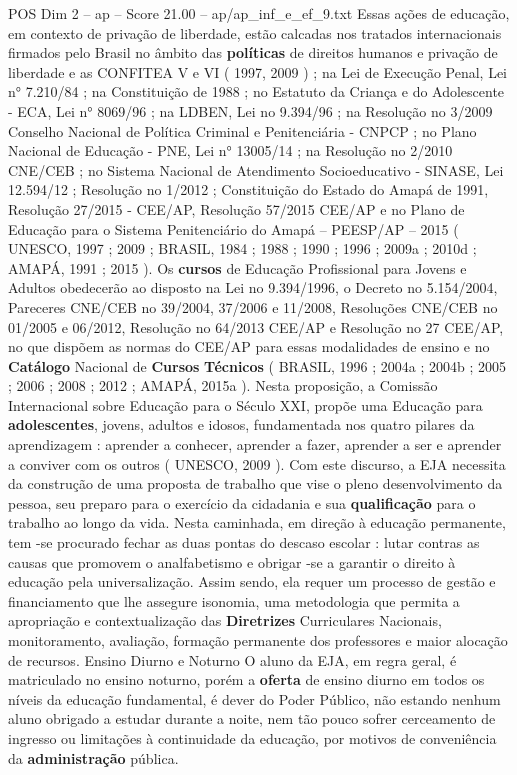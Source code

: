 \begin{textsample}{POS Dim 2 – ap – Score 21.00 – ap/ap\_inf\_e\_ef\_9.txt}
Essas ações de educação, em contexto de privação de liberdade, estão calcadas nos tratados internacionais firmados pelo Brasil no âmbito das \textbf{políticas} de direitos humanos e privação de liberdade e as CONFITEA V e VI ( 1997, 2009 ) ; na Lei de Execução Penal, Lei n{\EmojiFont °} 7.210/84 ; na Constituição de 1988 ; no Estatuto da Criança e do Adolescente - ECA, Lei n{\EmojiFont °} 8069/96 ; na LDBEN, Lei no 9.394/96 ; na Resolução no 3/2009 Conselho Nacional de Política Criminal e Penitenciária - CNPCP ; no Plano Nacional de Educação - PNE, Lei n{\EmojiFont °} 13005/14 ; na Resolução no 2/2010 CNE/CEB ; no Sistema Nacional de Atendimento Socioeducativo - SINASE, Lei 12.594/12 ; Resolução no 1/2012 ; Constituição do Estado do Amapá de 1991, Resolução 27/2015 - CEE/AP, Resolução 57/2015 CEE/AP e no Plano de Educação para o Sistema Penitenciário do Amapá – PEESP/AP – 2015 ( UNESCO, 1997 ; 2009 ; BRASIL, 1984 ; 1988 ; 1990 ; 1996 ; 2009a ; 2010d ; AMAPÁ, 1991 ; 2015 ).
Os \textbf{cursos} de Educação Profissional para Jovens e Adultos obedecerão ao disposto na Lei no 9.394/1996, o Decreto no 5.154/2004, Pareceres CNE/CEB no 39/2004, 37/2006 e 11/2008, Resoluções CNE/CEB no 01/2005 e 06/2012, Resolução no 64/2013 CEE/AP e Resolução no 27 CEE/AP, no que dispõem as normas do CEE/AP para essas modalidades de ensino e no \textbf{Catálogo} Nacional de \textbf{Cursos} \textbf{Técnicos} ( BRASIL, 1996 ; 2004a ; 2004b ; 2005 ; 2006 ; 2008 ; 2012 ; AMAPÁ, 2015a ).
Nesta proposição, a Comissão Internacional sobre Educação para o Século XXI, propõe uma Educação para \textbf{adolescentes}, jovens, adultos e idosos, fundamentada nos quatro pilares da aprendizagem : aprender a conhecer, aprender a fazer, aprender a ser e aprender a conviver com os outros ( UNESCO, 2009 ).
Com este discurso, a EJA necessita da construção de uma proposta de trabalho que vise o pleno desenvolvimento da pessoa, seu preparo para o exercício da cidadania e sua \textbf{qualificação} para o trabalho ao longo da vida.
Nesta caminhada, em direção à educação permanente, tem -se procurado fechar as duas pontas do descaso escolar : lutar contras as causas que promovem o analfabetismo e obrigar -se a garantir o direito à educação pela universalização.
Assim sendo, ela requer um processo de gestão e financiamento que lhe assegure isonomia, uma metodologia que permita a apropriação e contextualização das \textbf{Diretrizes} Curriculares Nacionais, monitoramento, avaliação, formação permanente dos professores e maior alocação de recursos.
Ensino Diurno e Noturno O aluno da EJA, em regra geral, é matriculado no ensino noturno, porém a \textbf{oferta} de ensino diurno em todos os níveis da educação fundamental, é dever do Poder Público, não estando nenhum aluno obrigado a estudar durante a noite, nem tão pouco sofrer cerceamento de ingresso ou limitações à continuidade da educação, por motivos de conveniência da \textbf{administração} pública.

\end{textsample}
